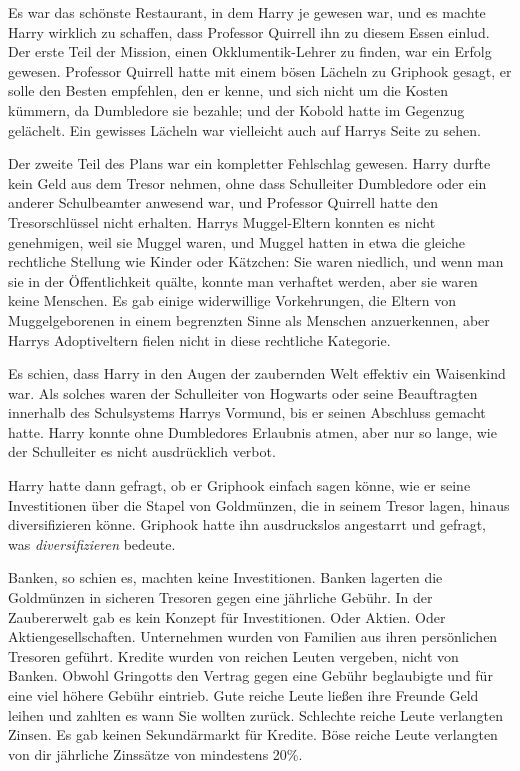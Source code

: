 Es war das schönste Restaurant, in dem Harry je gewesen war, und es machte Harry
wirklich zu schaffen, dass Professor Quirrell ihn zu diesem Essen einlud. Der
erste Teil der Mission, einen Okklumentik-Lehrer zu finden, war ein Erfolg
gewesen. Professor Quirrell hatte mit einem bösen Lächeln zu Griphook gesagt, er
solle den Besten empfehlen, den er kenne, und sich nicht um die Kosten kümmern,
da Dumbledore sie bezahle; und der Kobold hatte im Gegenzug gelächelt. Ein
gewisses Lächeln war vielleicht auch auf Harrys Seite zu sehen.

Der zweite Teil des Plans war ein kompletter Fehlschlag gewesen. Harry durfte
kein Geld aus dem Tresor nehmen, ohne dass Schulleiter Dumbledore oder ein
anderer Schulbeamter anwesend war, und Professor Quirrell hatte den
Tresorschlüssel nicht erhalten. Harrys Muggel-Eltern konnten es nicht
genehmigen, weil sie Muggel waren, und Muggel hatten in etwa die gleiche
rechtliche Stellung wie Kinder oder Kätzchen: Sie waren niedlich, und wenn man
sie in der Öffentlichkeit quälte, konnte man verhaftet werden, aber sie waren
keine Menschen. Es gab einige widerwillige Vorkehrungen, die Eltern von
Muggelgeborenen in einem begrenzten Sinne als Menschen anzuerkennen, aber Harrys
Adoptiveltern fielen nicht in diese rechtliche Kategorie.

Es schien, dass Harry in den Augen der zaubernden Welt effektiv ein Waisenkind
war. Als solches waren der Schulleiter von Hogwarts oder seine Beauftragten
innerhalb des Schulsystems Harrys Vormund, bis er seinen Abschluss gemacht
hatte. Harry konnte ohne Dumbledores Erlaubnis atmen, aber nur so lange, wie der
Schulleiter es nicht ausdrücklich verbot.

Harry hatte dann gefragt, ob er Griphook einfach sagen könne, wie er seine
Investitionen über die Stapel von Goldmünzen, die in seinem Tresor lagen, hinaus
diversifizieren könne. Griphook hatte ihn ausdruckslos angestarrt und gefragt,
was \glqq{}\emph{diversifizieren}\grqq{} bedeute.

Banken, so schien es, machten keine Investitionen. Banken lagerten die
Goldmünzen in sicheren Tresoren gegen eine jährliche Gebühr. In der Zaubererwelt
gab es kein Konzept für Investitionen. Oder Aktien. Oder Aktiengesellschaften.
Unternehmen wurden von Familien aus ihren persönlichen Tresoren geführt. Kredite
wurden von reichen Leuten vergeben, nicht von Banken. Obwohl Gringotts den
Vertrag gegen eine Gebühr beglaubigte und für eine viel höhere Gebühr eintrieb.
Gute reiche Leute ließen ihre Freunde Geld leihen und zahlten es wann Sie
wollten zurück. Schlechte reiche Leute verlangten Zinsen. Es gab keinen
Sekundärmarkt für Kredite. Böse reiche Leute verlangten von dir jährliche
Zinssätze von mindestens 20\%.

